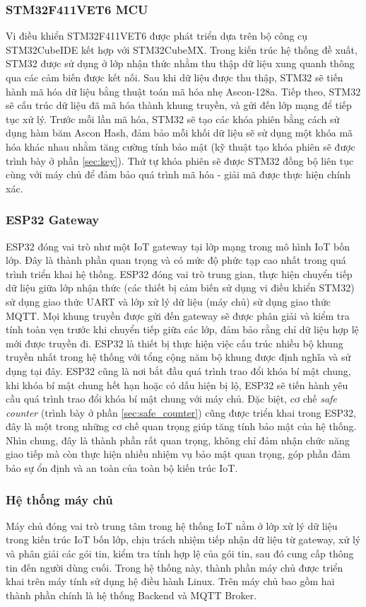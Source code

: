 \subsubsection{STM32F411VET6 MCU}
Vi điều khiển STM32F411VET6 được phát triển dựa trên bộ công cụ STM32CubeIDE kết hợp với STM32CubeMX. Trong kiến trúc hệ thống đề xuất, STM32 được sử dụng ở lớp nhận thức nhằm thu thập dữ liệu xung quanh thông qua các cảm biến được kết nối. Sau khi dữ liệu được thu thập, STM32 sẽ tiến hành mã hóa dữ liệu bằng thuật toán mã hóa nhẹ Ascon-128a. Tiếp theo, STM32 sẽ cấu trúc dữ liệu đã mã hóa thành khung truyền, và gửi đến lớp mạng để tiếp tục xử lý. Trước mỗi lần mã hóa, STM32 sẽ tạo các khóa phiên bằng cách sử dụng hàm băm Ascon Hash, đảm bảo mỗi khối dữ liệu sẽ sử dụng một khóa mã hóa khác nhau nhằm tăng cường tính bảo mật (kỹ thuật tạo khóa phiên sẽ được trình bày ở phần \ref{sec:key}). Thứ tự khóa phiên sẽ được STM32 đồng bộ liên tục cùng với máy chủ để đảm bảo quá trình mã hóa - giải mã được thực hiện chính xác.

\subsubsection{ESP32 Gateway}
ESP32 đóng vai trò như một IoT gateway tại lớp mạng trong mô hình IoT bốn lớp. Đây là thành phần quan trọng và có mức độ phức tạp cao nhất trong quá trình triển khai hệ thống. ESP32 đóng vai trò trung gian, thực hiện chuyển tiếp dữ liệu giữa lớp nhận thức (các thiết bị cảm biến sử dụng vi điều khiển STM32) sử dụng giao thức UART và lớp xử lý dữ liệu (máy chủ) sử dụng giao thức MQTT. Mọi khung truyền được gửi đến gateway sẽ được phân giải và kiểm tra tính toàn vẹn trước khi chuyển tiếp giữa các lớp, đảm bảo rằng chỉ dữ liệu hợp lệ mới được truyền đi. ESP32 là thiết bị thực hiện việc cấu trúc nhiều bộ khung truyền nhất trong hệ thống với tổng cộng năm bộ khung được định nghĩa và sử dụng tại đây. ESP32 cũng là nơi bắt đầu quá trình trao đổi khóa bí mật chung, khi khóa bí mật chung hết hạn hoặc có dấu hiện bị lộ, ESP32 sẽ tiến hành yêu cầu quá trình trao đổi khóa bí mật chung với máy chủ. Đặc biệt, cơ chế \textit{safe counter} (trình bày ở phần \ref{sec:safe_counter}) cũng được triển khai trong ESP32, đây là một trong những cơ chế quan trọng giúp tăng tính bảo mật của hệ thống. Nhìn chung, đây là thành phần rất quan trọng, không chỉ đảm nhận chức năng giao tiếp mà còn thực hiện nhiều nhiệm vụ bảo mật quan trọng, góp phần đảm bảo sự ổn định và an toàn của toàn bộ kiến trúc IoT.

\subsubsection{Hệ thống máy chủ}
Máy chủ đóng vai trò trung tâm trong hệ thống IoT nằm ở lớp xử lý dữ liệu trong kiến trúc IoT bốn lớp, chịu trách nhiệm tiếp nhận dữ liệu từ gateway, xử lý và phân giải các gói tin, kiểm tra tính hợp lệ của gói tin, sau đó cung cấp thông tin đến người dùng cuối. Trong hệ thống này, thành phần máy chủ được triển khai trên máy tính sử dụng hệ điều hành Linux. Trên máy chủ bao gồm hai thành phần chính là hệ thống Backend và MQTT Broker. 

